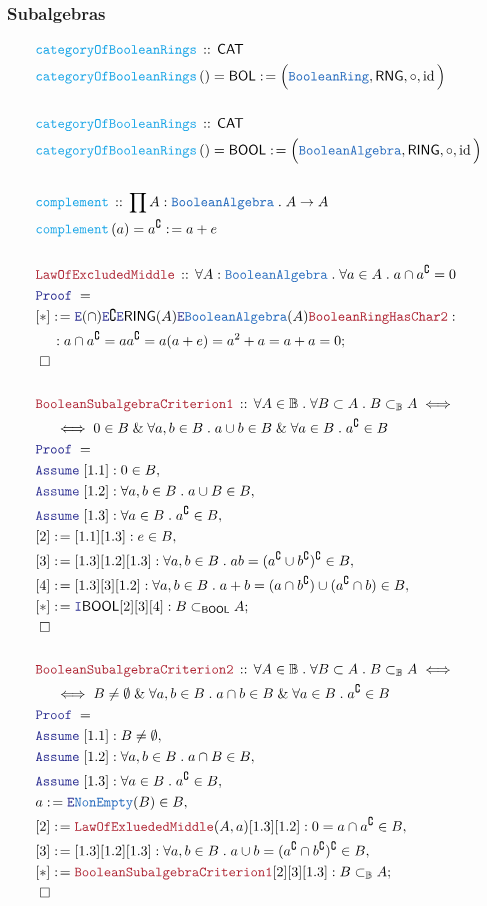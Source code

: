 \documentclass[12pt]{scrartcl}
\newcommand{\TYPE}[1]{\textcolor{NavyBlue}{\mathtt{#1}}}
\newcommand{\FUNC}[1]{\textcolor{Cerulean}{\mathtt{#1}}}
\newcommand{\LOGIC}[1]{\textcolor{Blue}{\mathtt{#1}}}
\newcommand{\THM}[1]{\textcolor{Maroon}{\mathtt{#1}}}
\renewcommand{\.}{\; . \;}
\newcommand{\de}{: \kern 0.1pc =}
\newcommand{\Act}[1]{\left( #1 \right)}
\newcommand{\Theorem}[2]{& \THM{#1} \, :: \, #2 \\ & \Proof = \\ }
\newcommand{\DeclareFunc}[2]{& \FUNC{#1} \, :: \, #2 \\}
\newcommand{\DefineNamedFunc}[4]{&  \FUNC{#1}\Act{#2} = #3 \de #4 \\}
\newcommand{\NewLine}{\\ & \kern 1pc}
\newcommand{\Page}[1]{ \begin{align*} #1 \end{align*}   }
\renewcommand{\And}{\; \& \;}
\newcommand{\Intro}{\LOGIC{I}}
\newcommand{\Elim}{\LOGIC{E}}
\DeclareMathOperator*{\id}{id}
\renewcommand{\c}{\complement}
\newcommand{\Say}[3]{& #1 \de #2 : #3, \\}
\newcommand{\SayIn}[3]{& #1 \de #2 \in #3, \\}
\newcommand{\Conclude}[3]{& #1 \de #2 : #3; \\}
\newcommand{\Assume}[2]{& \LOGIC{Assume} \; #1 : #2, \\}
\newcommand{\QED}{\; \square}
\newcommand{\EndProof}{& \QED \\}
\newcommand{\Proof}{\LOGIC{Proof} \; }
\newcommand{\CAT}{\mathsf{CAT}}
\newcommand{\RING}{\mathsf{RING}}
\newcommand{\RNG}{\mathsf{RNG}}
\newcommand{\Bool}{\mathbb{B}}
\newcommand{\BR}{\TYPE{BooleanRing}}
\newcommand{\BA}{\TYPE{BooleanAlgebra}}
\newcommand{\BOL}{\mathsf{BOL}}
\newcommand{\BOOL}{\mathsf{BOOL}}
\begin{document}
\subsubsection{Subalgebras}
\Page{
	\DeclareFunc{categoryOfBooleanRings}{\CAT}
	\DefineNamedFunc{categoryOfBooleanRings}{}{\BOL}{\Big( \BR, \RNG  ,\circ,\id\Big)}
	\\
	\DeclareFunc{categoryOfBooleanRings}{\CAT}
	\DefineNamedFunc{categoryOfBooleanRings}{}{\BOOL}{\Big( \BA, \RING  ,\circ,\id\Big)}
	\\
	\DeclareFunc{complement}{\prod A : \BA \. A \to A}
	\DefineNamedFunc{complement}{a}{a^\c}{a + e}
	\\
	\Theorem{LawOfExcludedMiddle}{\forall A : \BA \. \forall a \in A \. a \cap a^\c = 0}
	\Conclude{[*]}{\Elim(\cap)\Elim \c \Elim \RING(A) \Elim \BA(A) \THM{BooleanRingHasChar2}}
	{
		\NewLine :
		a \cap a^\c = 
		aa^\c =
		a(a + e) =
		a^2 + a =
		a + a = 
		0
	}
	\EndProof
	\\
	\Theorem{BooleanSubalgebraCriterion1}
	{
		\forall A \in \Bool \. 
		\forall B \subset A \.
		B \subset_\Bool A \iff
		\NewLine \iff
		0 \in B \And \forall a,b \in B \. a \cup b \in B \And \forall a \in B \. a^\c \in B
	}
	\Assume{[1.1]}{0 \in B}
	\Assume{[1.2]}{\forall a,b \in B \. a \cup B \in B}
	\Assume{[1.3]}{\forall a \in B \. a^\c \in B}
	\Say{[2]}{[1.1][1.3]}{e \in B}
	\Say{[3]}{[1.3][1.2][1.3]}{\forall a,b \in B \. ab = (a^\c \cup b^\c )^\c \in B}
	\Say{[4]}{[1.3][3][1.2]}{\forall a,b \in B \. a + b = (a \cap b^\c) \cup (a^\c \cap b) \in B }
	\Conclude{[*]}{\Intro \BOOL [2][3][4]}{B \subset_\BOOL A}
	\EndProof
	\\
	\Theorem{BooleanSubalgebraCriterion2}
	{
		\forall A \in \Bool \. 
		\forall B \subset A \.
		B \subset_\Bool A \iff
		\NewLine \iff
		B \neq \emptyset \And \forall a,b \in B \. a \cap b \in B \And \forall a \in B \. a^\c \in B
	}
	\Assume{[1.1]}{B \neq \emptyset}
	\Assume{[1.2]}{\forall a,b \in B \. a \cap B \in B}
	\Assume{[1.3]}{\forall a \in B \. a^\c \in B}
	\SayIn{ a }{\Elim \TYPE{NonEmpty}(B)}{B}
	\Say{[2]}{\THM{LawOfExluededMiddle}(A,a)[1.3][1.2]}{ 0 = a \cap a^\c \in B }
	\Say{[3]}{[1.3][1.2][1.3]}{\forall a,b \in B \. a \cup b = (a^\c \cap b^\c )^\c \in B}
	\Conclude{[*]}{\THM{BooleanSubalgebraCriterion1}[2][3][1.3]}{B \subset_\Bool A}
	\EndProof
}
\newpage
\end{document}

